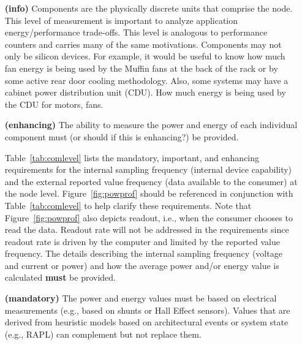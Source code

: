 \begin{itemize}

\item[\textbf{(info)}]
Components are the physically discrete units that comprise the node. This level of measurement 
is important to analyze application energy/performance trade-offs. This level is analogous 
to performance counters and carries many of the same motivations.  Components may not 
only be silicon devices.  For example, it would be useful to know how much fan energy is 
being used by the Muffin fans at the back of the rack or by some active rear door cooling 
methodology.  Also, some systems may have a cabinet power distribution unit (CDU).  How 
much energy is being used by the CDU for motors, fans.
	
\item[\textbf{(enhancing)}]
The ability to measure the power and energy of each individual component must 
(or should if this is enhancing?) be provided.
	
Table~\ref{tab:comlevel} lists the mandatory, important, and enhancing requirements for 
the internal sampling frequency (internal device capability) and the external reported value 
frequency (data available to the consumer) at the node level. Figure~\ref{fig:powprof} should 
be referenced in conjunction with Table~\ref{tab:comlevel} to help clarify these requirements. 
Note that Figure~\ref{fig:powprof} also depicts readout, i.e., when the consumer chooses to 
read the data. Readout rate will not be addressed in the requirements since readout rate 
is driven by the computer and limited by the reported value frequency. The details describing 
the internal sampling frequency (voltage and current or power) and how the average 
power and/or energy value is calculated \textbf{must} be provided.

\item[\textbf{(mandatory)}]
The power and energy values must be based on electrical measurements (e.g., based on 
shunts or Hall Effect sensors). Values that are derived from heuristic models based 
on architectural events or system state (e.g., RAPL) can complement but not replace them.
\end{itemize}


